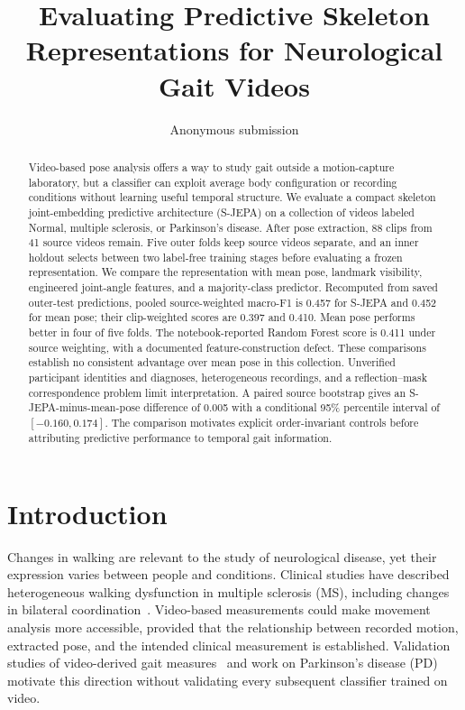 \documentclass[10pt,twocolumn,letterpaper]{article}
\title{Evaluating Predictive Skeleton Representations for Neurological Gait Videos}
\author{Anonymous submission}
\begin{document}
\maketitle
\begin{abstract}
Video-based pose analysis offers a way to study gait outside a motion-capture laboratory, but a classifier can exploit average body configuration or recording conditions without learning useful temporal structure. We evaluate a compact skeleton joint-embedding predictive architecture (S-JEPA) on a collection of videos labeled Normal, multiple sclerosis, or Parkinson's disease. After pose extraction, 88 clips from 41 source videos remain. Five outer folds keep source videos separate, and an inner holdout selects between two label-free training stages before evaluating a frozen representation. We compare the representation with mean pose, landmark visibility, engineered joint-angle features, and a majority-class predictor. Recomputed from saved outer-test predictions, pooled source-weighted macro-F1 is 0.457 for S-JEPA and 0.452 for mean pose; their clip-weighted scores are 0.397 and 0.410. Mean pose performs better in four of five folds. The notebook-reported Random Forest score is 0.411 under source weighting, with a documented feature-construction defect. These comparisons establish no consistent advantage over mean pose in this collection. Unverified participant identities and diagnoses, heterogeneous recordings, and a reflection--mask correspondence problem limit interpretation. A paired source bootstrap gives an S-JEPA-minus-mean-pose difference of 0.005 with a conditional 95\% percentile interval of $[-0.160,0.174]$. The comparison motivates explicit order-invariant controls before attributing predictive performance to temporal gait information.
\end{abstract}

\section{Introduction}
Changes in walking are relevant to the study of neurological disease, yet their expression varies between people and conditions. Clinical studies have described heterogeneous walking dysfunction in multiple sclerosis (MS), including changes in bilateral coordination~\cite{filli2018,plotnik2020}. Video-based measurements could make movement analysis more accessible, provided that the relationship between recorded motion, extracted pose, and the intended clinical measurement is established. Validation studies of video-derived gait measures~\cite{stenum2021,stenum2024} and work on Parkinson's disease (PD)~\cite{shin2021} motivate this direction without validating every subsequent classifier trained on video.
\end{document}
